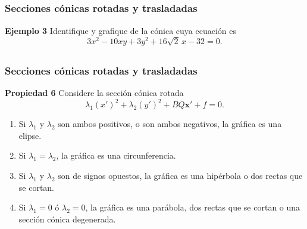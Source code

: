 
\subsection{}

\begin{frame}\frametitle{Secciones cónicas rotadas y trasladadas}
	
	\begin{ej}{\textbf{Ejemplo 3}} \justifying
		Identifique y grafique de la cónica cuya ecuación es
		\[
		3x^2 - 10xy + 3y^2 + 16\sqrt{2}\,x - 32 = 0.
		\]
	\end{ej}
	
\end{frame}


\subsection{}

\begin{frame}\frametitle{Secciones cónicas rotadas y trasladadas}
	
	\begin{prop}{\textbf{Propiedad 6}}\justifying 
		Considere la sección cónica rotada		
		\[
			\lambda_1\left(x'\right)^2 + \lambda_2\left(y'\right)^2 + BQ\mathbf{x'} + f = 0.
		\]
		
		\vspace{-0mm}
		\begin{enumerate}[$a$]\justifying 
			\item Si $\lambda_1$ y $\lambda_2$ son ambos positivos, o son ambos negativos, la gráfica es una elipse.
			\item Si $\lambda_1=\lambda_2$, la gráfica es una circunferencia.
			\item Si $\lambda_1$ y $\lambda_2$ son de signos opuestos, la gráfica es una hipérbola o 
			dos rectas que se cortan.
			\item Si $\lambda_1=0$ ó $\lambda_2=0$, la gráfica es una parábola, dos rectas que se cortan
			o una sección cónica degenerada.
		\end{enumerate}
	\end{prop}
	
\end{frame}
